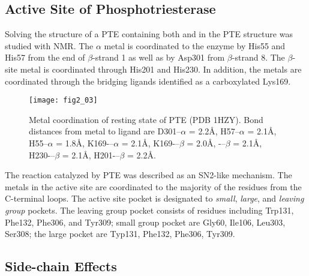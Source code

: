 \begin{refsection}
\subsection{Active Site of Phosphotriesterase}

Solving the structure of a PTE containing both  and
 in the PTE structure was studied with NMR\cite{Benning2001a}. The
$\alpha$ metal is coordinated to the enzyme by His55 and His57 from the
end of $\beta$-strand 1 as well as by Asp301 from $\beta$-strand 8. The
$\beta$-site metal is coordinated through His201 and His230. In addition, the
metals are coordinated through the bridging ligands identified as a
carboxylated Lys169.

\begin{figure}[h!] 
    \centering 
    \texttt{[image: fig2\_03]}
    \caption[Metal
        coordination of resting state of PTE (PDB 1HZY). Bond distances from
        metal to ligand are D301--$\alpha$ = 2.2\AA, H57--$\alpha$ = 2.1\AA,
        H55--$\alpha$ = 1.8\AA, K169-–$\alpha$ = 2.1\AA, K169-–$\beta$ =
        2.0\AA, -–$\beta$ = 2.1\AA, H230-–$\beta$ = 2.1\AA,
    H201-–$\beta$ = 2.2\AA.]{Metal coordination of resting state of PTE (PDB
        1HZY). Bond distances from metal to ligand are D301--$\alpha$ = 2.2\AA,
        H57--$\alpha$ = 2.1\AA, H55--$\alpha$ = 1.8\AA, K169-–$\alpha$ =
        2.1\AA, K169-–$\beta$ = 2.0\AA,
    -–$\beta$ = 2.1\AA, H230-–$\beta$ = 2.1\AA, H201-–$\beta$ = 2.2\AA.} 
    \label{fig:pte-active-site-chap2}
\end{figure}

The reaction catalyzed by PTE was described as an SN2-like mechanism. The
metals in the active site are coordinated to the majority of the residues from
the C-terminal loops. The active site pocket is designated to \emph{small},
\emph{large}, and \emph{leaving group} pockets. The leaving group pocket
consists of residues including Trp131, Phe132, Phe306, and Tyr309; small group
pocket are Gly60, Ile106, Leu303, Ser308; the large pocket are Typ131, Phe132,
Phe306, Tyr309.

\subsection{Side-chain Effects}
\label{sec:side-chain}


\end{refsection}
